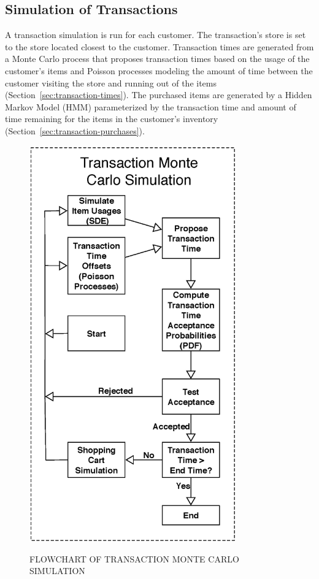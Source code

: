\subsection{Simulation of Transactions}
A transaction simulation is run for each customer. The transaction's store is set to the store located closest to the customer.  Transaction times are generated from a Monte Carlo process that proposes transaction times based on the usage of the customer's items and Poisson processes modeling the amount of time between the customer visiting the store and running out of the items (Section~\ref{sec:transaction-times}).  The purchased items are generated by a Hidden Markov Model (HMM) parameterized by the transaction time and amount of time remaining for the items in the customer's inventory (Section~\ref{sec:transaction-purchases}).

\begin{figure}[!t]
  \centering
  \caption{\uppercase{Flowchart of Transaction Monte Carlo Simulation}}
  \includegraphics[width=3.5in]{figures/bigpetstore/transaction_simulation.eps}
  \label{fig:trans_sim}
\end{figure}

